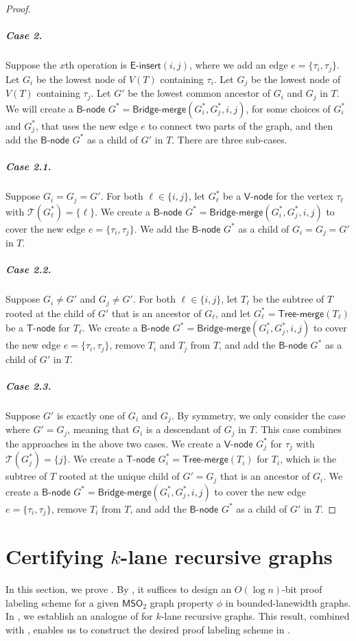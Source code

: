 \documentclass[11pt]{article}
\theoremstyle{definition}
\theoremstyle{remark}
\newcommand{\MSO}{\mathsf{MSO}_2}
\newcommand{\inse}{\mathsf{E}\text{-}\mathsf{insert}}
\newcommand{\tmerge}{\mathsf{Tree}\text{-}\mathsf{merge}}
\newcommand{\bmerge}{\mathsf{Bridge}\text{-}\mathsf{merge}}
\newcommand{\vnode}{\mathsf{V}\text{-}\mathsf{node}}
\newcommand{\bnode}{\mathsf{B}\text{-}\mathsf{node}}
\newcommand{\tnode}{\mathsf{T}\text{-}\mathsf{node}}
\begin{document}
\begin{proof}
\subparagraph{Case 2.} Suppose the $x$th operation is $\inse(i,j)$, where we add an edge $e = \{\tau_i, \tau_j\}$. Let $G_i$ be the lowest node of $V(T)$ containing $\tau_i$. Let $G_j$ be the lowest node of $V(T)$ containing $\tau_j$. Let $G'$ be the lowest common ancestor of $G_i$ and $G_j$ in $T$. 
We will create a $\bnode$ $G^\ast=\bmerge(G_i^\ast, G_j^\ast, i, j)$, for some choices of $G_i^\ast$ and $G_j^\ast$, that uses the new edge $e$ to connect two parts of the graph, and then add the $\bnode$ $G^\ast$ as a child of $G'$ in $T$. There are three sub-cases.

\subparagraph{Case 2.1.} Suppose $G_i = G_j = G'$.  For both $\ell \in \{i,j\}$, let $G_\ell^\ast$ be a $\vnode$ for the vertex $\tau_\ell$ with $\mathcal{T}(G_\ell^\ast)=\{\ell\}$.  We create a $\bnode$ $G^\ast =\bmerge(G_i^\ast, G_j^\ast, i, j)$ to cover the new edge $e = \{\tau_i, \tau_j\}$. We add the $\bnode$ $G^\ast$ as a child of $G_i = G_j = G'$ in $T$.

\subparagraph{Case 2.2.} Suppose $G_i \neq G'$ and $G_j \neq G'$. For both $\ell \in \{i,j\}$, let $T_\ell$ be the subtree of $T$ rooted at the child of $G'$ that is an ancestor of $G_\ell$, and let $G_\ell^\ast = \tmerge(T_\ell)$ be a $\tnode$ for $T_\ell$.  We create a $\bnode$ $G^\ast =\bmerge(G_i^\ast, G_j^\ast, i, j)$ to cover the new edge $e = \{\tau_i, \tau_j\}$, remove $T_i$ and $T_j$ from $T$, and add the $\bnode$ $G^\ast$ as a child of $G'$ in $T$.

\subparagraph{Case 2.3.} Suppose $G'$ is exactly one of $G_i$ and $G_j$. By symmetry, we only consider the case where $G' = G_j$, meaning that $G_i$ is a descendant of $G_j$ in $T$. This case combines the approaches in the above two cases. We create a $\vnode$ $G_j^\ast$ for $\tau_j$ with $\mathcal{T}(G_j^\ast)=\{j\}$. We create a $\tnode$ $G_i^\ast = \tmerge(T_i)$ for $T_i$, which is the subtree of $T$ rooted at the unique child of $G'=G_j$ that is an ancestor of $G_i$. We create a $\bnode$ $G^\ast =\bmerge(G_i^\ast, G_j^\ast, i, j)$ to cover the new edge $e = \{\tau_i, \tau_j\}$, remove $T_i$ from $T$, and add the $\bnode$ $G^\ast$ as a child of $G'$ in $T$.
\end{proof}
    

\section{Certifying \texorpdfstring{$k$}{k}-lane recursive graphs}\label{sect:certification}

In this section, we prove .
By , it suffices to design an $O(\log n)$-bit proof labeling scheme for a given $\MSO$ graph property $\phi$ in bounded-lanewidth graphs. In , we establish an analogue of  for $k$-lane recursive graphs. This result, combined with , enables us to construct the desired proof labeling scheme in .
\end{document}

